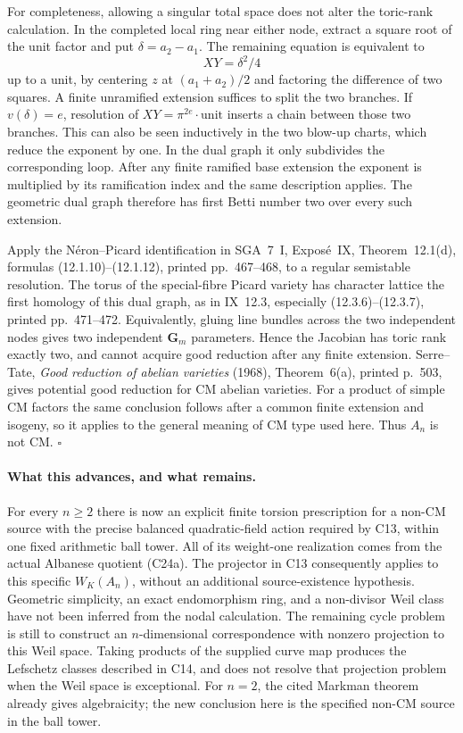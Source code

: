 \documentclass[11pt]{article}
\theoremstyle{definition}\newtheorem{definition}[theorem]{Definition}\newtheorem{remark}[theorem]{Remark}
\begin{document}
For completeness, allowing a singular total space does not
alter the toric-rank calculation. In the completed local
ring near either node, extract a square root of the unit
factor and put $\delta=a_2-a_1$. The remaining equation
is equivalent to
\[
 XY=\delta^2/4
\]
up to a unit, by centering $z$ at $(a_1+a_2)/2$ and
factoring the difference of two squares. A finite unramified
extension suffices to split the two branches. If
$v(\delta)=e$, resolution of $XY=\pi^{2e}\cdot\mathrm{unit}$
inserts a chain between those two branches. This can also
be seen inductively in the two blow-up charts, which reduce
the exponent by one. In the dual graph it only subdivides
the corresponding loop. After any finite ramified base
extension the exponent is multiplied by its ramification
index and the same description applies. The geometric
dual graph therefore has first Betti number two over
every such extension.

Apply the N\'eron--Picard identification in SGA~7~I,
Expos\'e~IX, Theorem~12.1(d), formulas (12.1.10)--(12.1.12), printed pp.~467--468,
to a regular semistable resolution. The torus of the
special-fibre Picard variety has character lattice the
first homology of this dual graph, as in IX~12.3,
especially (12.3.6)--(12.3.7), printed pp.~471--472. Equivalently, gluing line
bundles across the two independent nodes gives two
independent $\mathbf G_m$ parameters. Hence the Jacobian
has toric rank exactly two, and cannot acquire good
reduction after any finite extension. Serre--Tate,
\emph{Good reduction of abelian varieties} (1968),
Theorem~6(a), printed p.~503, gives potential good
reduction for CM abelian varieties. For a product of
simple CM factors the same conclusion follows after a
common finite extension and isogeny, so it applies to
the general meaning of CM type used here. Thus $A_n$
is not CM. \hfill$\square$

\paragraph{What this advances, and what remains.}
For every $n\geq2$ there is now an explicit finite torsion
prescription for a non-CM source with the precise balanced
quadratic-field action required by C13, within one fixed
arithmetic ball tower. All of its weight-one realization
comes from the actual Albanese quotient (C24a). The
projector in C13 consequently applies to this specific
$W_K(A_n)$, without an additional source-existence
hypothesis. Geometric simplicity, an exact endomorphism
ring, and a non-divisor Weil class have not been inferred
from the nodal calculation. The remaining cycle problem
is still to construct an $n$-dimensional correspondence
with nonzero projection to this Weil space. Taking
products of the supplied curve map produces the
Lefschetz classes described in C14, and does not resolve
that projection problem when the Weil space is
exceptional. For $n=2$, the cited Markman theorem already
gives algebraicity; the new conclusion here is the
specified non-CM source in the ball tower.
\end{document}
